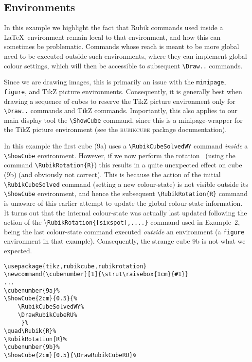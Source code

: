 \documentclass[a4paper]{article}
\newcommand{\cubenumber}[1]{\strut\raisebox{1cm}{#1}}
\begin{document}
\pagebreak

\subsection{Environments}


In this example we highlight the fact that Rubik commands used inside a \LaTeX\ 
environment remain local to that environment, and how this can sometimes  be 
problematic.  Commands whose reach is meant to be  more global need to be 
executed outside such environments, where they can implement  global colour 
settings, which will then be accessible to subsequent \verb!\Draw..! commands.

Since we are drawing images, this is primarily an issue 
with the  \verb!minipage!, \verb!figure!, and TikZ picture environments.
Consequently, it is generally best when drawing a sequence of  cubes  to reserve 
the TikZ picture environment  only  for  \verb!\Draw..! commands and TikZ 
commands. Importantly, this  also applies to our main display tool the \verb!\ShowCube! 
command, since this is a minipage-wrapper for the TikZ  picture environment 
(see the \textsc{rubikcube} package documentation).

In this example the first cube (9a) uses a \verb!\RubikCubeSolvedWY! command 
\textit{inside} a \verb!\ShowCube! environment. However, if we now perform the 
rotation  \textRubik{R}\ (using the command \verb!\RubikRotation{R}!) this results 
in  a quite unexpected effect on cube (9b) (and obviously not correct). 
This is because  the action of the initial \verb!\RubikCubeSolved! command 
 (setting a new colour-state) is not  visible outside its \verb!\ShowCube! 
 environment, and hence the subsequent \verb!\RubikRotation{R}! command is unaware 
 of this earlier attempt to update  the global colour-state information. 
 It turns out that the internal colour-state was actually last updated following 
 the action of the \textbackslash\texttt{RubikRotation\{[sixspot],....\}} 
 command used in Example~2, being the last colour-state command executed 
 \textit{outside} an environment (a \texttt{figure}  environment in that 
 example). Consequently, the strange cube 9b is not what we expected.

\medskip
\noindent%
\cubenumber{9a}%
%
\quad{}%
%
\cubenumber{9b}%
%
\hspace{5mm}
\begin{minipage}{0.5\textwidth}
\begin{verbatim}
\usepackage{tikz,rubikcube,rubikrotation}
\newcommand{\cubenumber}[1]{\strut\raisebox{1cm}{#1}}
...
\cubenumber{9a}%
\ShowCube{2cm}{0.5}{%
    \RubikCubeSolvedWY%
    \DrawRubikCubeRU%
     }%
\quad\Rubik{R}%
\RubikRotation{R}%
\cubenumber{9b}%
\ShowCube{2cm}{0.5}{\DrawRubikCubeRU}%
\end{verbatim}
\end{minipage}
\end{document}
